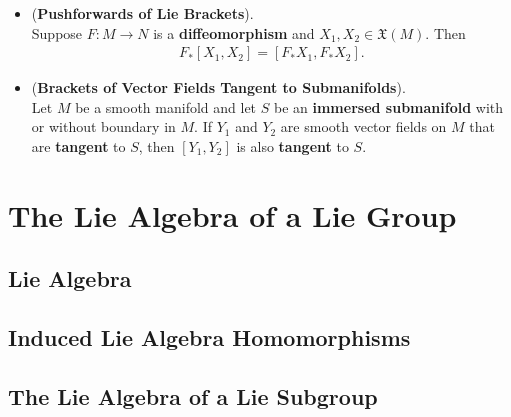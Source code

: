 \documentclass[11pt]{article}
\begin{document}
\begin{itemize}
\item \begin{corollary} (\textbf{Pushforwards of Lie Brackets}). \\
Suppose $F: M \rightarrow N$ is a \textbf{diffeomorphism} and $X_1, X_2\in \mathfrak{X}(M)$. Then 
\begin{align*}
F_{*}[X_1, X_2] = [F_{*}X_1,  F_{*} X_2].
\end{align*}
\end{corollary}

\item \begin{corollary} (\textbf{Brackets of Vector Fields Tangent to Submanifolds}). \\
Let $M$ be a smooth manifold and let $S$ be an \textbf{immersed submanifold} with or without boundary in $M$. If $Y_1$ and $Y_2$ are smooth vector fields on $M$ that are \textbf{tangent} to $S$, then $[Y_1, Y_2]$ is also \textbf{tangent} to $S$.
\end{corollary}
\end{itemize}

\section{The Lie Algebra of a Lie Group}
\subsection{Lie Algebra}

\subsection{Induced Lie Algebra Homomorphisms}

\subsection{The Lie Algebra of a Lie Subgroup}


\newpage


\end{document}
